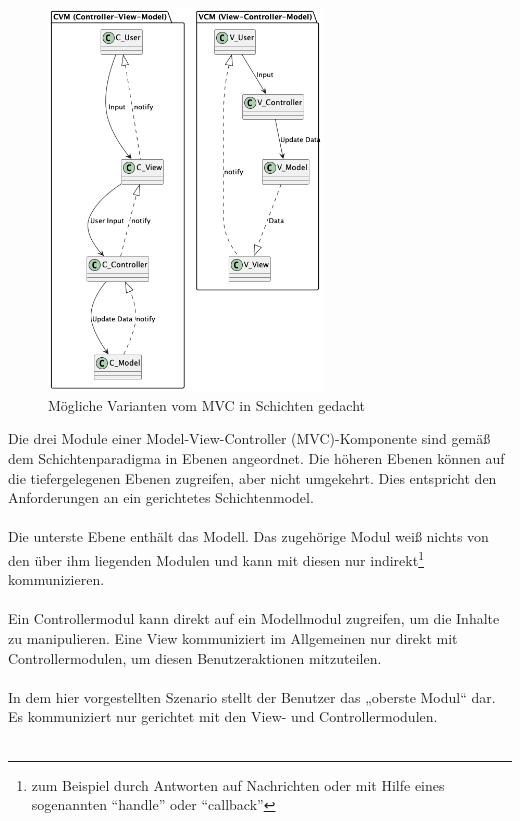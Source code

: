 \begin{figure}[ht]
  \centering
  \includegraphics[width=0.65\textwidth]{fig/uml/mvc-varianten.png}
  \caption{Mögliche Varianten vom MVC in Schichten gedacht}
  \label{fig:mvs-varianten}
\end{figure}
Die drei Module einer Model-View-Controller (MVC)-Komponente sind gemäß dem Schichtenparadigma in Ebenen angeordnet. Die höheren Ebenen können auf die tiefergelegenen Ebenen zugreifen, aber nicht umgekehrt. Dies entspricht den Anforderungen an ein gerichtetes Schichtenmodel. 
\\\\
Die unterste Ebene enthält das Modell. Das zugehörige Modul weiß nichts von den über ihm liegenden Modulen und kann mit diesen nur indirekt\footnote{zum Beispiel durch Antworten auf Nachrichten oder mit Hilfe eines sogenannten \enquote{handle} oder \enquote{callback}} kommunizieren.
\\\\
Ein Controllermodul kann direkt auf ein Modellmodul zugreifen, um die Inhalte zu manipulieren. Eine View kommuniziert im Allgemeinen nur direkt mit Controllermodulen, um diesen Benutzeraktionen mitzuteilen.
\\\\
In dem hier vorgestellten Szenario stellt der Benutzer das „oberste Modul“ dar. Es kommuniziert nur gerichtet mit den View- und Controllermodulen. 
\\\\
